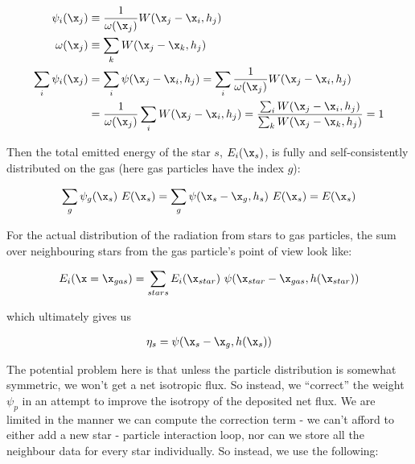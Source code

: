% 
\begin{align*}
	\psi_i(\x_j) &\equiv \frac{1}{\omega(\x_j)} W(\x_j - \x_i, h_j) 	\\
	\omega(\x_j) &\equiv \sum_k W(\x_j - \x_k, h_j) 						  	\\
	\sum_i \psi_i(\x_j) &= \sum_i \psi(\x_j - \x_i, h_j) = \sum_i \frac{1}{\omega(\x_j)} W(\x_j - 
\x_i, h_j) \\
	&= \frac{1}{\omega(\x_j)} \sum_i  W(\x_j - \x_i, h_j) = \frac{\sum_i  W(\x_j - \x_i, h_j) }{ 
\sum_k  W(\x_j - \x_k, h_j) } = 1
\end{align*}



Then the total emitted energy of the star $s$, $E_i(\x_s)$, is fully and self-consistently 
distributed on the gas (here gas particles have the index $g$):

\begin{align}
	\sum_g \psi_g(\x_s)\  E(\x_s) = \sum_g \psi(\x_s - \x_g, h_s) \ E(\x_s) = E(\x_s)
\end{align}


For the actual distribution of the radiation from stars to gas particles, the sum over neighbouring 
stars from the gas particle's point of view look like:

\begin{align}
	E_i (\x = \x_{gas}) = \sum_{stars} E_i(\x_{star}) \ \psi(\x_{star} - \x_{gas}, h(\x_{star}))
\end{align}

which ultimately gives us


\begin{align}
    \eta_s = \psi(\x_{s} - \x_{g}, h(\x_{s}))
\end{align}




The potential problem here is that unless the particle distribution is somewhat symmetric, we won't 
get a net isotropic flux. So instead, we ``correct'' the weight $\psi_p$ in an attempt to improve 
the isotropy of the deposited net flux. We are limited in the manner we can compute the correction 
term - we can't afford to either add a new star - particle interaction loop, nor can we store all 
the neighbour data for every star individually. So instead, we use the following:

